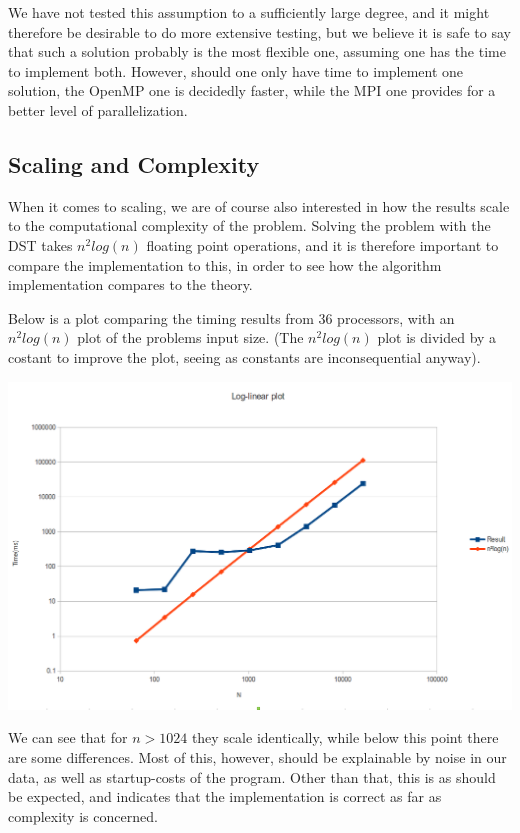 \documentclass[fontsize=11pt,paper=a4,titlepage]{article}
\begin{document}
We have not tested this assumption to a sufficiently large degree, and it might therefore be desirable to do more extensive testing, but we believe it is safe to say that such a solution probably is the most flexible one, assuming one has the time to implement both. However, should one only have time to implement one solution, the OpenMP one is decidedly faster, while the MPI one provides for a better level of parallelization.

\subsection{Scaling and Complexity}
When it comes to scaling, we are of course also interested in how the results scale to the computational complexity of the problem. Solving the problem with the DST takes $n^2log(n)$ floating point operations, and it is therefore important to compare the implementation to this, in order to see how the algorithm implementation compares to the theory.

Below is a plot comparing the timing results from 36 processors, with an $n^2log(n)$ plot of the problems input size. (The $n^2log(n)$ plot is divided by a costant to improve the plot, seeing as constants are inconsequential anyway).

\hspace*{-1cm}\includegraphics[scale=0.55]{pics/logplot.png}

We can see that for $n\gt1024$ they scale identically, while below this point
there are some differences. Most of this, however, should be explainable by
noise in our data, as well as startup-costs of the program. Other than that,
this is as should be expected, and indicates that the implementation is correct
as far as complexity is concerned.
\end{document}

